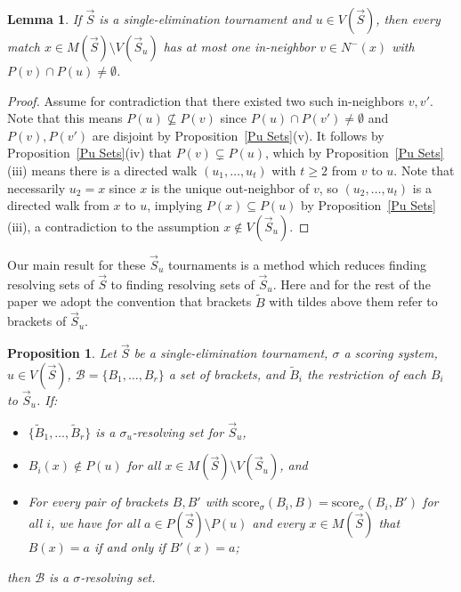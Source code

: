 \documentclass[12pt,letterpaper]{article}
\newtheorem{prop}[thm]{Proposition}
\newtheorem{lem}[thm]{Lemma}
\theoremstyle{definition}
\newcommand{\sig}{\sigma}
\renewcommand{\1}{\mathbbm{1}}
\newcommand{\sm}{\setminus}
\newcommand{\sub}{\subseteq}
\renewcommand{\c}[1]{\mathcal{#1}}
\newcommand{\score}{\mathrm{score}}
\newcommand{\tour}{\vec{S}}
\begin{document}
\begin{lem}\label{touru has at most one bad inneighbor}
	If $\tour$ is a single-elimination tournament and $u\in V(\tour)$, then every match $x\in M(\tour)\sm  V(\tour_u)$ has at most one in-neighbor $v\in N^-(x)$ with $P(v)\cap P(u)\ne \emptyset$.
\end{lem}
\begin{proof}
	Assume for contradiction that there existed two such in-neighbors $v,v'$.  Note that this means $P(u)\not \subseteq P(v)$ since $P(u)\cap P(v')\ne \emptyset$ and $P(v),P(v')$ are disjoint by Proposition~\ref{Pu Sets}(v).  It follows by Proposition~\ref{Pu Sets}(iv) that $P(v)\subsetneq P(u)$, which by Proposition~\ref{Pu Sets}(iii) means there is a directed walk $(u_1,\ldots,u_t)$ with $t\ge 2$ from $v$ to $u$.  Note that necessarily $u_2=x$ since $x$ is the unique out-neighbor of $v$, so $(u_2,\ldots,u_t)$ is a directed walk from $x$ to $u$, implying $P(x)\sub P(u)$ by Proposition~\ref{Pu Sets}(iii), a contradiction to the assumption $x\notin V(\tour_u)$.
\end{proof}

Our main result for these $\tour_u$ tournaments is a method which reduces finding resolving sets of $\tour$ to finding resolving sets of $\tour_u$.  Here and for the rest of the paper we adopt the convention that brackets $\widetilde{B}$ with tildes above them refer to brackets of $\tour_u$.
\begin{prop}\label{lifting brackets}
	Let $\tour$ be a single-elimination tournament, $\sig$ a scoring system, $u\in V(\tour)$, $\c{B}=\{B_1,\ldots,B_r\}$ a set of brackets, and $\widetilde{B}_i$ the restriction of each $B_i$ to $\tour_u$.  If:
	\begin{itemize}
		\item[(a)] $\{\widetilde{B}_1,\ldots,\widetilde{B}_r\}$ is a $\sig_u$-resolving set for $\tour_u$,
		\item[(b)] $B_i(x)\notin P(u)$ for all $x\in M(\tour)\sm  V(\tour_u)$, and 
		\item[(c)] For every pair of brackets $B,B'$ with $\score_\sig(B_i,B)=\score_\sig(B_i,B')$ for all $i$, we have for all $a\in P(\tour)\sm P(u)$ and every $x\in M(\tour)$ that $B(x)=a$ if and only if $B'(x)=a$;
	\end{itemize}
	then $\c{B}$ is a $\sig$-resolving set.
\end{prop}
\end{document}
